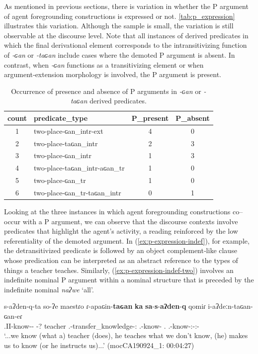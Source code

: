 \documentclass[12pt]{article}
\begin{document}
As mentioned in previous sections, there is variation in whether the P argument of agent foregrounding constructions is expressed or not. \autoref{tab:p_expression} illustrates this variation. Although the sample is small, the variation is still observable at the discourse level. Note that all instances of derived predicates in which the final derivational element corresponds to the intransitivizing function of \textit{‑ɢan} or \textit{‑taɢan} include cases where the demoted P argument is absent. In contrast, when \textit{‑ɢan} functions as a transitivizing element or when argument‑extension morphology is involved, the P argument is present.

\begin{table}[H]
\centering
\caption{Occurrence of presence and absence of P arguments in \textit{-ɢan} or \textit{-taɢan} derived predicates.} 
\begin{tabular}{clcc}
  \hline \hline
count & predicate\_type & P\_present & P\_absent \\ 
  \hline
1 & two-place-ɢan\_intr-ext &   4 &   0 \\ 
  2 & two-place-taɢan\_intr &   2 &   3 \\ 
  3 & two-place-ɢan\_intr &   1 &   3 \\ 
  4 & two-place-taɢan\_intr-aɢan\_tr &   1 &   0 \\ 
  5 & two-place-ɢan\_tr &   1 &   0 \\ 
  6 & two-place-ɢan\_tr-taɢan\_intr &   0 &   1 \\ 
   \hline \hline
\end{tabular}

\label{tab:p_expression}
\end{table}

Looking at the three instances in which agent foregrounding constructions co--occur with a P argument, we can observe that the discourse contexts involve predicates that highlight the agent’s activity, a reading reinforced by the low referentiality of the demoted argument. In (\ref{ex:p-expression-indef}), for example, the detransitivized predicate is followed by an object complement‑like clause whose predication can be interpreted as an abstract reference to the types of things a teacher teaches. Similarly, (\ref{ex:p-expression-indef-two}) involves an indefinite nominal P argument within a nominal structure that is preceded by the indefinite nominal \textit{naʔwe} ‘all’.

\begin{exe}
\ex 
	 \gll s-aʔden-q-ta so-ʔe maestɾo{\Sploan}  ɾ-apaɢin-\textbf{taɢan}  \textbf{ka} \textbf{sa}-\textbf{s}-\textbf{aʔden}-\textbf{q}     qomiɾ i-aʔdeːn-taɢan-ɢan-eɾ  \\
			         {\First.II}-know-{\Pl}-{\Dur} {\DetTwo}-{?} teacher {\Third\II.\Intr}-transfer\_knowledge-{\Vm:\Intr} {\DetOne}  {\Neg}{\First.\II}-know-{\Pl} {\First\Pl.\Pron} {\Third.\II}-know-{\Vm:\Intr}-{\Vm:\Tr}-{\Pl}\\
	\trans `...we know (what a) teacher (does), he teaches what we don't know, (he) makes us to know (or he instructs us)...'
  \hfill(mocCA190924\_1: 00:04:27)\label{ex:p-expression-indef}
\end{exe}
\end{document}

